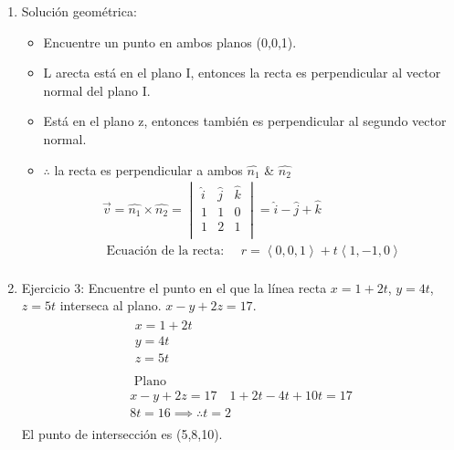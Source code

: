 \begin{enumerate}
    \item Solución geométrica:
        \begin{itemize}
            \item Encuentre un punto en ambos planos (0,0,1).
            \item L arecta está en el plano I, entonces la recta es perpendicular al vector normal del plano I.
            \item Está en el plano z, entonces también es perpendicular al segundo vector normal.
            \item $\therefore $ la recta es perpendicular a ambos $\hat{n_1}$ \& $\hat{n_2}$
                \begin{align*}
                    \vec{v} = \hat{n_1} \times \hat{n_2} = \begin{vmatrix}
                        \hat{i} & \hat{j} & \hat{k} \\ 
                        1 & 1 & 0 \\ 
                        1 & 2 & 1 \\ 
                    \end{vmatrix} = \hat{i} - \hat{j} + \hat{k} \\ 
                    \text{  Ecuación de la recta:  } \quad r = \left\langle 0,0,1 \right\rangle + t \left\langle 1,-1,0 \right\rangle \\ 
                \end{align*}
        \end{itemize}
    
    \item Ejercicio 3: Encuentre el punto en el que la línea recta $x=1+2t$, $y=4t$, $z=5t$ interseca al plano. $x-y+2z=17$.
        \begin{align*}
            \begin{matrix}
                x = 1+2t \\ 
                y = 4t \\ 
                z= 5t \\ 
            \end{matrix} \\ 
            \text{  Plano  } \\ 
            x-y+2z = 17 \quad 1+2t-4t+10t = 17 \\ 
            8t = 16 \implies \therefore  t = 2 \\ 
        \end{align*}
        El punto de intersección es (5,8,10).
    

\end{enumerate}
